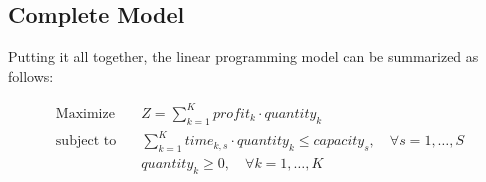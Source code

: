 \documentclass{article}
\begin{document}
\subsection*{Complete Model}
Putting it all together, the linear programming model can be summarized as follows:

\[
\begin{align*}
\text{Maximize} & \quad Z = \sum_{k=1}^{K} profit_{k} \cdot quantity_{k} \\
\text{subject to} & \quad \sum_{k=1}^{K} time_{k, s} \cdot quantity_{k} \leq capacity_{s}, \quad \forall s = 1, \ldots, S \\
& \quad quantity_{k} \geq 0, \quad \forall k = 1, \ldots, K
\end{align*}
\]
\end{document}
